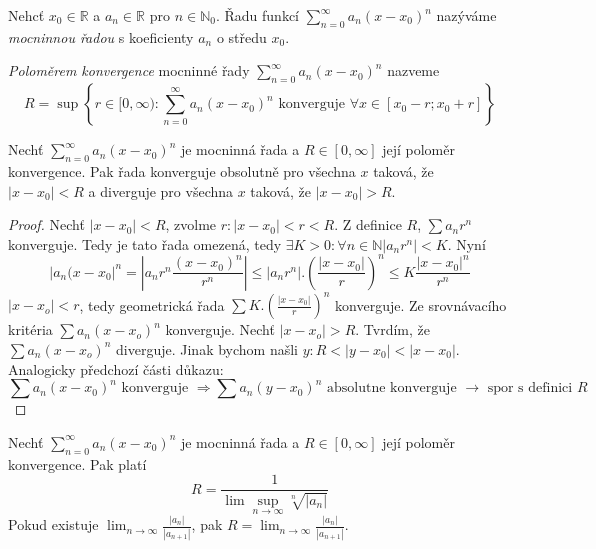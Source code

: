 \begin{definice}
Nehcť $x_0 \in \mathbb{R}$ a $a_n \in \mathbb{R}$ pro $n \in \mathbb{N}_0$. Řadu funkcí $\sum_{n=0}^{\infty} a_n (x-x_0)^n$ nazýváme \emph{mocninnou řadou} s koeficienty $a_n$ o středu $x_0$.
\end{definice}

\begin{definice}
\emph{Poloměrem konvergence} mocninné řady $\sum_{n=0}^{\infty} a_n (x-x_0)^n$ nazveme $$R = \sup \left\{ r \in [ 0,\infty ) : \sum_{n=0}^{\infty}  a_n ( x - x_0 )^n \textrm{ konverguje } \forall x \in [ x_0 - r; x_0 + r ] \right\}$$
\end{definice}

\begin{vetal}
Nechť $\sum_{n=0}^{\infty} a_n (x-x_0)^n$ je mocninná řada a $R \in [ 0, \infty ]$ její poloměr konvergence. Pak řada konverguje obsolutně pro všechna $x$ taková, že $| x - x_0| < R$ a diverguje pro všechna $x$ taková, že $| x - x_0 | > R$.
\end{vetal}

\begin{proof}
Nechť $|x-x_0|<R$, zvolme $r: |x-x_0|<r<R$. Z definice $R$, $\sum a_nr^n$ konverguje. Tedy je tato řada omezená, tedy $\exists K>0:\forall n \in \mathbb{N} |a_nr^n|<K$.
Nyní
$$|a_n(x-x_0|^n = |a_n r^n \frac{(x-x_0)^n}{r^n}| \leq |a_nr^n|. \left( \frac{|x-x_0|}{r} \right)^n \leq K \frac{|x-x_0|^n}{r^n} $$
$|x-x_o|<r$, tedy geometrická řada $\sum K. \left( \frac{|x-x_0|}{r} \right)^n$ konverguje. Ze srovnávacího kritéria $\sum a_n(x-x_o)^n$ konverguje.
Nechť $|x-x_o|>R$. Tvrdím, že $\sum a_n(x-x_o)^n$ diverguje. Jinak bychom našli $y: R< |y-x_0| < |x-x_0|$. Analogicky předchozí části důkazu:
$$\sum a_n(x-x_0)^n \textrm{ konverguje } \Rightarrow \sum a_n(y-x_0)^n \textrm{ absolutne konverguje } \rightarrow \textrm{ spor s definici } R$$
\end{proof}

\begin{vetal}
Nechť $\sum_{n=0}^{\infty} a_n (x-x_0)^n$ je mocninná řada a $R \in [ 0, \infty ]$ její poloměr konvergence. Pak platí
$$R = \frac{1}{ \lim \sup_{n \rightarrow \infty} \sqrt[n]{| a_n |} }$$
Pokud existuje $\lim_{n \rightarrow \infty} \frac{|a_n|}{|a_{n+1}|}$, pak $R = \lim_{n \rightarrow \infty} \frac{|a_n|}{|a_{n+1}|}$.
\end{vetal}

